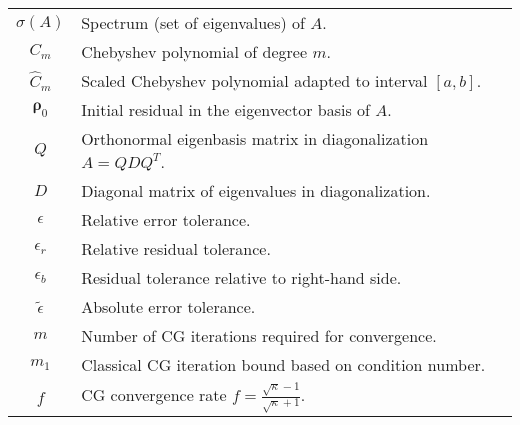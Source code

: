 \begin{longtable}{c p{10cm}}
    $\sigma(A)$                      & Spectrum (set of eigenvalues) of $A$.                                                                       \\
    $C_m$                            & Chebyshev polynomial of degree $m$.                                                                         \\
    $\hat{C}_m$                      & Scaled Chebyshev polynomial adapted to interval $[a,b]$.                                                    \\
    $\mathbf{\rho}_0$                & Initial residual in the eigenvector basis of $A$.                                                           \\
    $Q$                              & Orthonormal eigenbasis matrix in diagonalization $A = QDQ^T$.                                               \\
    $D$                              & Diagonal matrix of eigenvalues in diagonalization.                                                          \\
    $\epsilon$                       & Relative error tolerance.                                                                                   \\
    $\epsilon_r$                     & Relative residual tolerance.                                                                                \\
    $\epsilon_b$                     & Residual tolerance relative to right-hand side.                                                             \\
    $\tilde{\epsilon}$               & Absolute error tolerance.                                                                                   \\
    $m$                              & Number of CG iterations required for convergence.                                                           \\
    $m_1$                            & Classical CG iteration bound based on condition number.                                                     \\
    $f$                              & CG convergence rate $f = \frac{\sqrt{\kappa} - 1}{\sqrt{\kappa} + 1}$.                                      \\
\end{longtable}

